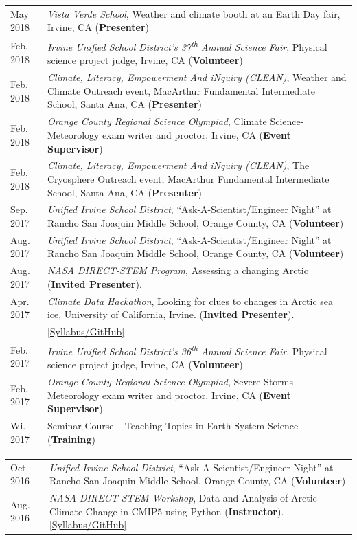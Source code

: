 \documentclass[margin,line,palatino,courier,10pt]{res}
\begin{document}
\begin{resume}
\begin{tabular}{@{}p{0.9in}p{4in}}
May 2018 & \textit{Vista Verde School}, Weather and climate booth at an Earth Day fair, Irvine, CA (\textbf{Presenter})\\
Feb. 2018 & \textit{Irvine Unified School District's 37\textsuperscript{th} Annual Science Fair}, Physical science project judge, Irvine, CA (\textbf{Volunteer})\\
Feb. 2018 & \textit{Climate, Literacy, Empowerment And iNquiry (CLEAN)}, Weather and Climate Outreach event, MacArthur Fundamental Intermediate School, Santa Ana, CA (\textbf{Presenter})\\
Feb. 2018 & \textit{Orange County Regional Science Olympiad}, Climate Science-Meteorology exam writer and proctor, Irvine, CA (\textbf{Event Supervisor})\\
Feb. 2018 & \textit{Climate, Literacy, Empowerment And iNquiry (CLEAN)}, The Cryosphere Outreach event, MacArthur Fundamental Intermediate School, Santa Ana, CA (\textbf{Presenter})\\
Sep. 2017 & \textit{Unified Irvine School District}, ``Ask-A-Scientist/Engineer Night'' at Rancho San Joaquin Middle School, Orange County, CA (\textbf{Volunteer})\\
Aug. 2017 & \textit{Unified Irvine School District}, ``Ask-A-Scientist/Engineer Night'' at Rancho San Joaquin Middle School, Orange County, CA (\textbf{Volunteer})\\
Aug. 2017 & \textit{NASA DIRECT-STEM Program}, Assessing a changing Arctic (\textbf{Invited Presenter}).\\
Apr. 2017 & \textit{Climate Data Hackathon}, Looking for clues to changes in Arctic 
sea ice, University of California, Irvine. (\textbf{Invited Presenter}).\\ & \href{https://github.com/UCIDataScienceInitiative/Climate_Hackathon}{[Syllabus/GitHub]}\\
Feb. 2017 & \textit{Irvine Unified School District's 36\textsuperscript{th} Annual Science Fair}, Physical science project judge, Irvine, CA (\textbf{Volunteer})\\
Feb. 2017 & \textit{Orange County Regional Science Olympiad}, Severe Storms-Meteorology exam writer and proctor, Irvine, CA (\textbf{Event Supervisor})\\
Wi. 2017 & Seminar Course -- Teaching Topics in Earth System Science (\textbf{Training})\\
\end{tabular}
\begin{tabular}{@{}p{0.9in}p{4in}}
Oct. 2016 & \textit{Unified Irvine School District}, ``Ask-A-Scientist/Engineer Night'' at Rancho San Joaquin Middle School, Orange County, CA (\textbf{Volunteer})\\
Aug. 2016 & \textit{NASA DIRECT-STEM Workshop}, Data and Analysis of Arctic Climate Change in CMIP$5$ using Python (\textbf{Instructor}). \href{https://github.com/strongh/DIRECT-STEM-climate-workshop}{[Syllabus/GitHub]}\\
\end{tabular}


\end{resume}
\end{document}
